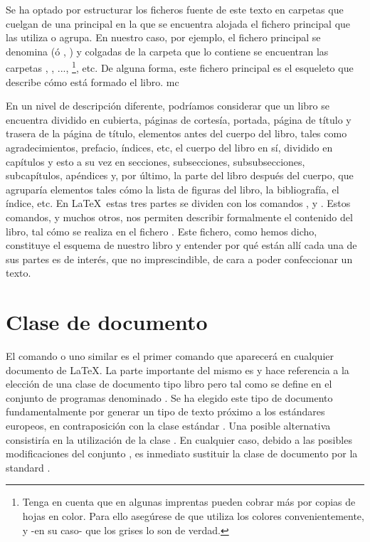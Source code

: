 Se ha optado por estructurar los ficheros fuente de este texto en carpetas que cuelgan de una principal en la que se
encuentra alojada el fichero principal que las utiliza o agrupa. En nuestro caso, por ejemplo, el fichero principal se
denomina  (ó , ) y colgadas de la carpeta
que lo contiene se encuentran las carpetas , , ...,
\footnote{Tenga en cuenta que en algunas imprentas pueden cobrar más por copias de hojas en
color. Para ello asegúrese de que utiliza los colores convenientemente, y -en su caso- que los grises lo son de
verdad.}, etc. De alguna forma, este fichero principal es el esqueleto que describe cómo está formado el libro. \gls{mc}

En un nivel de descripción diferente, podríamos considerar que un libro se encuentra dividido en cubierta, páginas de cortesía, portada, página de título y trasera de la página de título, elementos antes del cuerpo del libro, tales como agradecimientos, prefacio, índices, etc, el cuerpo del libro en sí, dividido en capítulos y esto a su vez en secciones, subsecciones, subsubsecciones, %
subcapítulos, apéndices y, por último, la parte del libro después del cuerpo, que agruparía elementos tales cómo la lista de figuras del libro, la bibliografía, el índice, etc. En \LaTeX\ estas tres partes se dividen con los comandos  ,  y . Estos comandos, y muchos otros, nos permiten describir formalmente el contenido del libro, tal cómo se realiza en el fichero . Este fichero, como hemos dicho, constituye el esquema de nuestro libro y entender por qué están allí cada una de sus partes es de interés, que no imprescindible, de cara a poder confeccionar un texto. 

\section{Clase de documento}
El comando  o uno similar es el primer comando que aparecerá en cualquier documento de \LaTeX. La parte importante del mismo es  y hace referencia a la elección de una  clase de documento tipo libro pero tal como se define en el conjunto de programas denominado . Se ha elegido este tipo de documento fundamentalmente por generar un tipo de texto próximo a los estándares europeos, en contraposición con la clase estándar . Una posible alternativa consistiría en la utilización de la clase . En cualquier caso, debido a las posibles modificaciones del conjunto , es inmediato sustituir la clase de documento por la standard .

